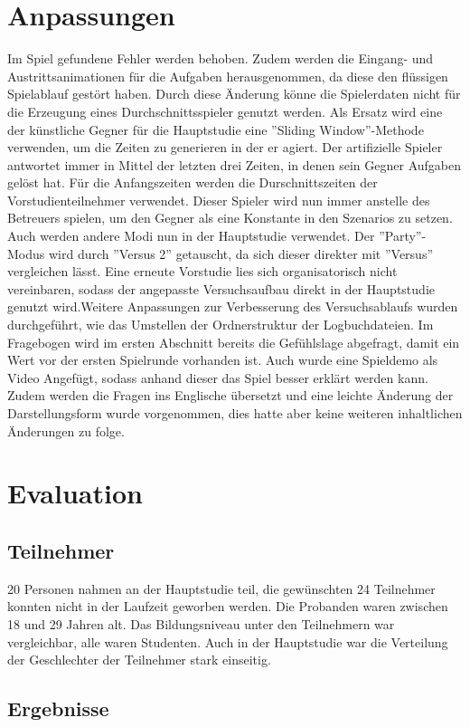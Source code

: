 \section{Anpassungen}
Im Spiel gefundene Fehler werden behoben. Zudem werden die Eingang- und Austrittsanimationen für die Aufgaben herausgenommen, da diese den flüssigen Spielablauf gestört haben. Durch diese Änderung könne die Spielerdaten nicht für die Erzeugung eines Durchschnittsspieler genutzt werden. Als Ersatz wird eine der künstliche Gegner für die Hauptstudie  eine ''Sliding Window''-Methode verwenden, um die Zeiten zu generieren in der er agiert. Der artifizielle Spieler antwortet immer in Mittel der letzten drei Zeiten, in denen sein Gegner Aufgaben gelöst hat. Für die Anfangszeiten werden die Durschnittszeiten der Vorstudienteilnehmer verwendet. Dieser Spieler wird nun immer anstelle des Betreuers spielen, um den Gegner als eine Konstante in den Szenarios zu setzen. Auch werden andere Modi nun in der Hauptstudie verwendet. Der ''Party''-Modus wird durch ''Versus 2'' getauscht, da sich dieser direkter mit ''Versus'' vergleichen lässt. Eine erneute Vorstudie lies sich organisatorisch nicht vereinbaren, sodass der angepasste Versuchsaufbau direkt in der Hauptstudie genutzt wird.\newline Weitere Anpassungen zur Verbesserung des Versuchsablaufs wurden durchgeführt, wie das Umstellen der Ordnerstruktur der Logbuchdateien. Im Fragebogen wird im ersten Abschnitt bereits die Gefühlslage abgefragt, damit ein Wert vor der ersten Spielrunde vorhanden ist. Auch wurde eine Spieldemo als Video Angefügt, sodass anhand dieser das Spiel besser erklärt werden kann. Zudem werden die Fragen ins Englische übersetzt und eine leichte Änderung der Darstellungsform wurde vorgenommen, dies hatte aber keine weiteren inhaltlichen Änderungen zu folge.
\section{Evaluation}
\subsection{Teilnehmer}
20 Personen nahmen an der Hauptstudie teil, die gewünschten 24 Teilnehmer konnten nicht in der Laufzeit geworben werden. Die Probanden waren zwischen 18 und 29 Jahren alt. Das Bildungsniveau unter den Teilnehmern war vergleichbar, alle waren Studenten. Auch in der Hauptstudie war die Verteilung der Geschlechter der Teilnehmer stark einseitig.
\subsection{Ergebnisse}


